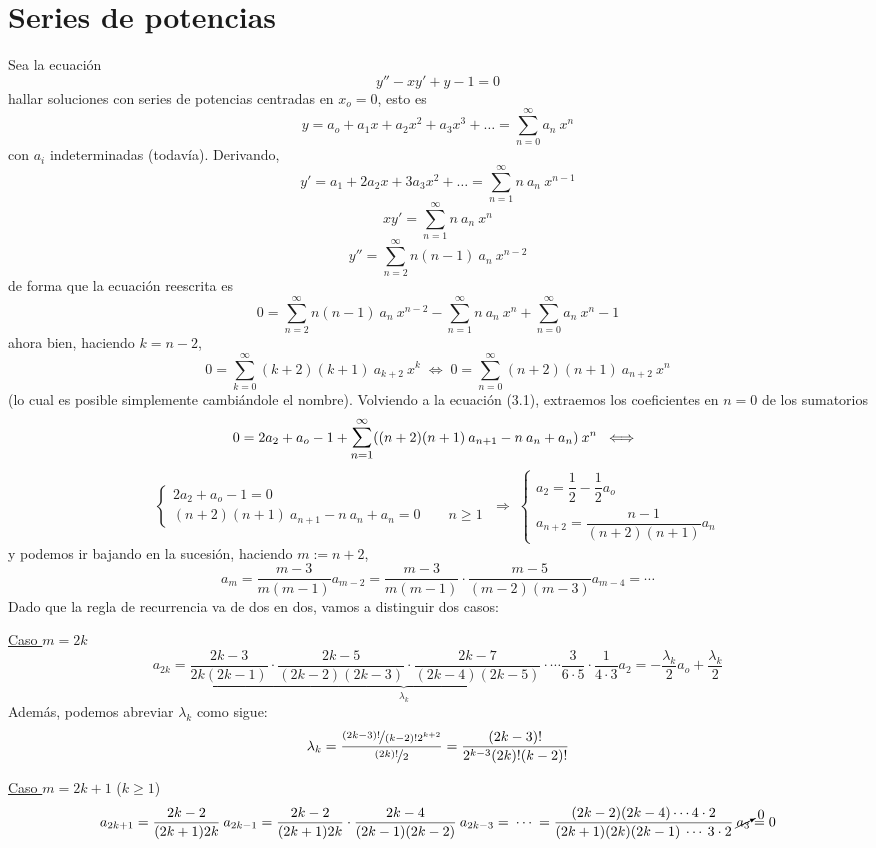 \section{Series de potencias}
\begin{eje}
Sea la ecuación 
$$y''-xy'+y-1=0$$
hallar soluciones con series de potencias centradas en $x_o=0$, esto es 
$$y=a_o+a_1x+a_2x^2+a_3x^3+\ldots=\sum_{n=0}^{\infty} a_n \: x^n$$ 
con $a_i$ indeterminadas (todavía). Derivando,
$$y'=a_1+2a_2x+3a_3x^2+ \ldots = \sum_{n=1}^{\infty} n \: a_n \: x^{n-1}$$
$$xy'=\sum_{n=1}^{\infty} n \: a_n \: x^{n}$$
$$y''=\sum_{n=2}^{\infty} n(n-1) \: a_n \: x^{n-2}$$
de forma que la ecuación reescrita es
\begin{equation}
    0=\sum_{n=2}^{\infty} n(n-1) \: a_n \: x^{n-2} - \sum_{n=1}^{\infty} n \: a_n \: x^{n}+\sum_{n=0}^{\infty} a_n \: x^n -1 
\end{equation}
ahora bien, haciendo $k=n-2$, 
$$0=\sum_{k=0}^{\infty} (k+2)(k+1) \: a_{k+2} \: x^{k} \; \iff \; 0=\sum_{n=0}^{\infty} (n+2)(n+1) \: a_{n+2} \: x^{n}$$
(lo cual es posible simplemente cambiándole el nombre). Volviendo a la ecuación (3.1), extraemos los coeficientes en $n=0$ de los sumatorios
$$0=2a_2+a_o-1+\mathlarger{\sum_{n=1}^{\infty}} ((n+2)(n+1) \: a_{n+1} - n \: a_n + a_n) \: x^n \; \iff \;$$ $$ \begin{cases} 2a_2+a_o-1=0 \\ (n+2)(n+1) \: a_{n+1} - n \: a_n + a_n = 0 \qquad  n \geq 1 
\end{cases} \; \Rightarrow \; \begin{cases}
    a_2=\dfrac{1}{2}-\dfrac{1}{2} a_o \\ a_{n+2}=\dfrac{n-1}{(n+2)(n+1)}a_n 
\end{cases}$$ 
y podemos ir bajando en la sucesión, haciendo $m:=n+2$, $$a_m=\dfrac{m-3}{m(m-1)}a_{m-2}=\dfrac{m-3}{m(m-1)} \cdot \dfrac{m-5}{(m-2)(m-3)}a_{m-4}= \cdots$$
Dado que la regla de recurrencia va de dos en dos, vamos a distinguir dos casos:

\underline{Caso $m=2k$}
$$a_{2k}=\underbrace{\dfrac{2k-3}{2k(2k-1)} \cdot \dfrac{2k-5}{(2k-2)(2k-3)} \cdot \dfrac{2k-7}{(2k-4)(2k-5)} \cdot \cdots \dfrac{3}{6 \cdot 5} \cdot \dfrac{1}{4 \cdot 3}}_{\lambda_k} a_2= -\dfrac{\lambda_k}{2}a_o+\dfrac{\lambda_k}{2}$$
Además, podemos abreviar $\lambda_k$ como sigue:
$$\lambda_k=\dfrac{\nicefrac{(2k-3)!}{(k-2)!2^{k+2}}}{\nicefrac{(2k)!}{2}}=\dfrac{(2k-3)!}{2^{k-3}(2k)!(k-2)!}$$

\underline{Caso $m=2k+1$} ($k \geq 1$)
$$a_{2k+1}=\dfrac{2k-2}{(2k+1)2k}\: a_{2k-1}=\dfrac{2k-2}{(2k+1)2k}\cdot \dfrac{2k-4}{(2k-1)(2k-2)}\: a_{2k-3}= \: \cdots \:  = \dfrac{(2k-2)(2k-4) \cdots 4 \cdot 2}{(2k+1)(2k)(2k-1) \: \cdots \: 3 \cdot 2} \:\cancelto{0}{a_3}=0$$


\end{eje}
